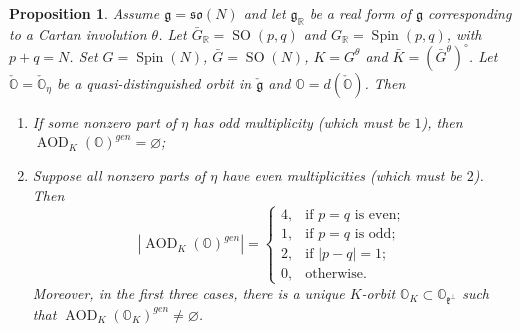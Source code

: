 \documentclass[11pt, a4paper]{amsart}
\newcommand{\g}{\mathfrak{g}}
\newcommand{\orb}{\mathbb{O}}
\newcommand{\orbk}{\orb_{K}}
\newcommand{\fg}{\mathfrak{g}}
\newcommand{\fk}{\mathfrak{k}}
\newcommand{\ckfg}{{\check{\fg}}}
\newcommand{\ckorb}{\check{\orb}}
\newcommand{\fso}{\mathfrak{so}}
\DeclareMathOperator{\AOD}{AOD}
\newcommand{\AODK}{\AOD_K}
\newcommand{\SO}{\operatorname{SO}}
\newcommand{\Spin}{\operatorname{Spin}}
\newcommand{\R}{\mathbb{R}}
\newtheorem{Prop}[Thm]{Proposition}
\theoremstyle{definition}
\numberwithin{equation}{section}
\begin{document}
\begin{Prop} \label{prop:adm_Spin_pq}
	Assume $\g = \fso(N)$ and let $\g_\R$ be a real form of $\g$ corresponding to a Cartan involution $\theta$. Let $\bar{G}_\R = \SO(p,q)$ and $G_\R = \Spin(p,q)$, with $p+q=N$. Set $G = \Spin(N)$, $\bar{G} = \SO(N)$, $K = G^\theta$ and $\bar{K} = (\bar{G}^\theta)^\circ$. Let $\ckorb = \ckorb_\eta$ be a quasi-distinguished orbit in $\ckfg$ and $\orb = d(\ckorb)$. Then 
	\begin{enumerate}[itemindent=*, leftmargin=*]
		\item If some nonzero part of $\eta$ has odd multiplicity (which must be $1$), then $\AODK(\orb)^{gen} = \varnothing$;
		\item Suppose all nonzero parts of $\eta$ have even multiplicities (which must be $2$). Then %
		\[
			|\AODK(\orb)^{gen}| =
			\begin{cases}
				4, & \text{if } p=q \text{ is even}; \\
				1, & \text{if } p=q \text{ is odd}; \\
				2, & \text{if } |p-q|=1; \\
				0, & \text{otherwise}.
			\end{cases}
		\]
		Moreover, in the first three cases, there is a unique $K$-orbit $\orbk \subset \orb_{\fk^\perp}$ such that $\AODK(\orbk)^{gen} \neq \varnothing$.
	\end{enumerate}
\end{Prop}

\end{document}
